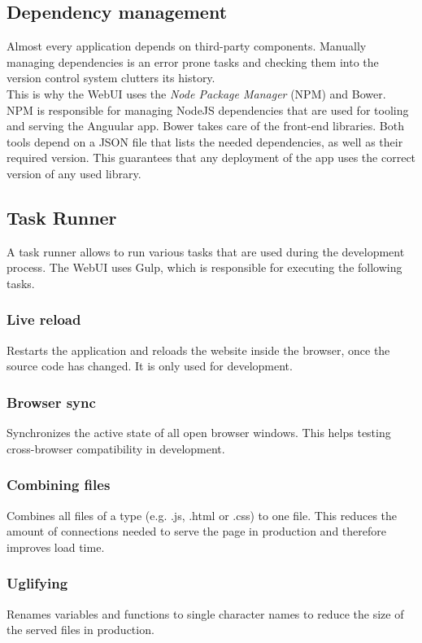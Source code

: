 \subsection{Dependency management}
Almost every application depends on third-party components. Manually managing dependencies is an error prone tasks and checking them into the version control system clutters its history.\\
This is why the WebUI uses the \textit{Node Package Manager} (NPM) and Bower. NPM is responsible for managing NodeJS dependencies that are used for tooling and serving the Anguular app. Bower takes care of the front-end libraries. Both tools depend on a JSON file that lists the needed dependencies, as well as their required version. This guarantees that any deployment of the app uses the correct version of any used library.


\subsection{Task Runner}
A task runner allows to run various tasks that are used during the development process. The WebUI uses Gulp, which is responsible for executing the following tasks.

\subsubsection{Live reload} Restarts the application and reloads the website inside the browser, once the source code has changed. It is only used for development.

\subsubsection{Browser sync} Synchronizes the active state of all open browser windows. This helps testing cross-browser compatibility in development.

\subsubsection{Combining files} Combines all files of a type (e.g. .js, .html or .css) to one file. This reduces the amount of connections needed to serve the page in production and therefore improves load time.

\subsubsection{Uglifying} Renames variables and functions to single character names to reduce the size of the served files in production.

